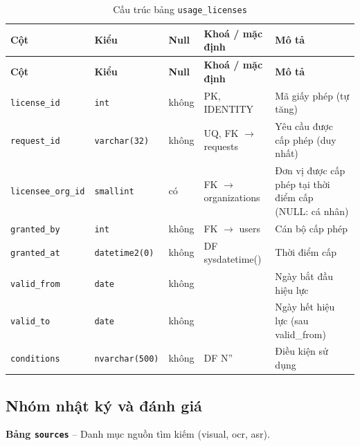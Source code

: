 \setlength{\tabcolsep}{4pt}
\begin{longtable}{>{\raggedright\arraybackslash}p{}>{\raggedright\arraybackslash}p{}>{\centering\arraybackslash}p{}>{\raggedright\arraybackslash}p{}>{\raggedright\arraybackslash}p{}}
\caption{Cấu trúc bảng \texttt{usage\_licenses}}\label{tab:col_usage_licenses}\\
\toprule \textbf{Cột} & \textbf{Kiểu} & \textbf{Null} & \textbf{Khoá / mặc định} & \textbf{Mô tả} \\ \midrule \endfirsthead
\toprule \textbf{Cột} & \textbf{Kiểu} & \textbf{Null} & \textbf{Khoá / mặc định} & \textbf{Mô tả} \\ \midrule \endhead
\bottomrule \endfoot
\texttt{license\_id} & {\footnotesize\texttt{int}} & không & PK, IDENTITY & Mã giấy phép (tự tăng) \\
\texttt{request\_id} & {\footnotesize\texttt{varchar(32)}} & không & UQ, FK $\rightarrow$ requests & Yêu cầu được cấp phép (duy nhất) \\
\texttt{licensee\_org\_id} & {\footnotesize\texttt{smallint}} & có & FK $\rightarrow$ organizations & Đơn vị được cấp phép tại thời điểm cấp (NULL: cá nhân) \\
\texttt{granted\_by} & {\footnotesize\texttt{int}} & không & FK $\rightarrow$ users & Cán bộ cấp phép \\
\texttt{granted\_at} & {\footnotesize\texttt{datetime2(0)}} & không & DF sysdatetime() & Thời điểm cấp \\
\texttt{valid\_from} & {\footnotesize\texttt{date}} & không &  & Ngày bắt đầu hiệu lực \\
\texttt{valid\_to} & {\footnotesize\texttt{date}} & không &  & Ngày hết hiệu lực (sau valid\_from) \\
\texttt{conditions} & {\footnotesize\texttt{nvarchar(500)}} & không & DF N'' & Điều kiện sử dụng \\
\end{longtable}

\subsection{Nhóm nhật ký và đánh giá}

\textbf{Bảng \texttt{sources}} -- Danh mục nguồn tìm kiếm (visual, ocr, asr).

